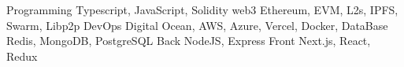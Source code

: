 


\begin{cvskills}

\cvskill
{Programming} %
{Typescript, JavaScript, Solidity} %
\cvskill
{web3} %
{Ethereum, EVM, L2s, IPFS, Swarm, Libp2p} %
\cvskill
{DevOps} %
{Digital Ocean, AWS, Azure, Vercel, Docker, } %
\cvskill
{DataBase} %
{Redis, MongoDB, PostgreSQL} %
\cvskill
{Back} %
{NodeJS, Express} %
\cvskill
{Front} %
{Next.js, React, Redux} %
\end{cvskills}
